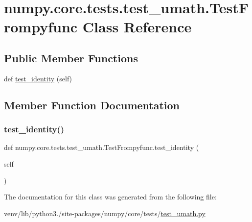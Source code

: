 \hypertarget{classnumpy_1_1core_1_1tests_1_1test__umath_1_1TestFrompyfunc}{}\section{numpy.\+core.\+tests.\+test\+\_\+umath.\+Test\+Frompyfunc Class Reference}
\label{classnumpy_1_1core_1_1tests_1_1test__umath_1_1TestFrompyfunc}
\subsection*{Public Member Functions}
\begin{DoxyCompactItemize}
\item 
def \hyperlink{classnumpy_1_1core_1_1tests_1_1test__umath_1_1TestFrompyfunc_aa5ac153030a15bfe25df4d094079951b}{test\+\_\+identity} (self)
\end{DoxyCompactItemize}


\subsection{Member Function Documentation}
\mbox{\label{classnumpy_1_1core_1_1tests_1_1test__umath_1_1TestFrompyfunc_aa5ac153030a15bfe25df4d094079951b}} 
\subsubsection{\texorpdfstring{test\+\_\+identity()}{test\_identity()}}
{\footnotesize\ttfamily def numpy.\+core.\+tests.\+test\+\_\+umath.\+Test\+Frompyfunc.\+test\+\_\+identity (\begin{DoxyParamCaption}\item[{}]{self }\end{DoxyParamCaption})}



The documentation for this class was generated from the following file\+:\begin{DoxyCompactItemize}
\item 
venv/lib/python3./site-\/packages/numpy/core/tests/\hyperlink{test__umath_8py}{test\+\_\+umath.\+py}\end{DoxyCompactItemize}
